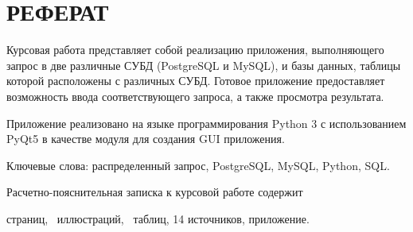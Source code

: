 

\chapter*{РЕФЕРАТ}

Курсовая работа представляет собой реализацию приложения, выполняющего запрос в две различные СУБД (PostgreSQL и MySQL), и базы данных, таблицы которой расположены с различных СУБД. Готовое приложение предоставляет возможность ввода соответствующего запроса, а также просмотра результата.

Приложение реализовано на языке программирования Python 3 с использованием PyQt5 в качестве модуля для создания GUI приложения.

Ключевые слова: распределенный запрос, PostgreSQL, MySQL, Python, SQL.

Расчетно-пояснительная записка к курсовой работе содержит  \begin{NoHyper}\pageref{LastPage}\end{NoHyper} страниц, \totfig~иллюстраций, \tottab~таблиц, 14 источников,  приложение.